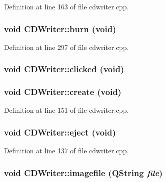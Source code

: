 Definition at line 163 of file cdwriter.cpp.\hypertarget{class_c_d_writer_844d256e7cccd1de34db4e5fa3690dc6}{
\subsubsection[{burn}]{\setlength{\rightskip}{0pt plus 5cm}void CDWriter::burn (void)}}
\label{class_c_d_writer_844d256e7cccd1de34db4e5fa3690dc6}




Definition at line 297 of file cdwriter.cpp.\hypertarget{class_c_d_writer_0191ce407c2ebb99f3140bb44b9a9170}{
\subsubsection[{clicked}]{\setlength{\rightskip}{0pt plus 5cm}void CDWriter::clicked (void)}}
\label{class_c_d_writer_0191ce407c2ebb99f3140bb44b9a9170}


\hypertarget{class_c_d_writer_a5dd84acfc0eb5f4a8dc8cb88b305996}{
\subsubsection[{create}]{\setlength{\rightskip}{0pt plus 5cm}void CDWriter::create (void)}}
\label{class_c_d_writer_a5dd84acfc0eb5f4a8dc8cb88b305996}




Definition at line 151 of file cdwriter.cpp.\hypertarget{class_c_d_writer_383389be2723db312550f11951efd1a3}{
\subsubsection[{eject}]{\setlength{\rightskip}{0pt plus 5cm}void CDWriter::eject (void)}}
\label{class_c_d_writer_383389be2723db312550f11951efd1a3}




Definition at line 137 of file cdwriter.cpp.\hypertarget{class_c_d_writer_f7035db82b553bab5942c320a348728e}{
\subsubsection[{imagefile}]{\setlength{\rightskip}{0pt plus 5cm}void CDWriter::imagefile (QString {\em file})}}
\label{class_c_d_writer_f7035db82b553bab5942c320a348728e}




